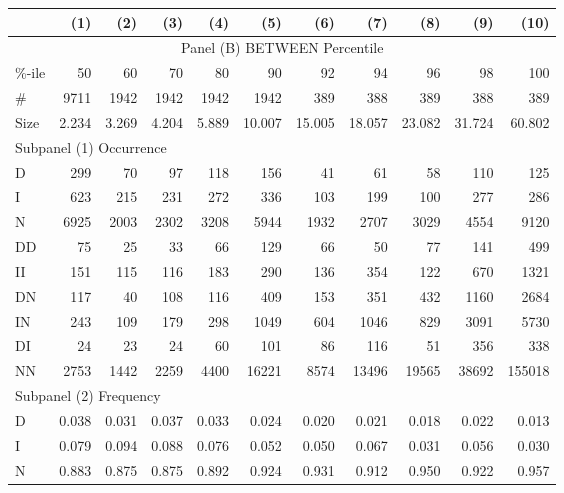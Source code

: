 \clearpage
{\footnotesize \begin{tabular}{lrrrrrrrrrr}
\hline\hline
&   (1) &   (2) &   (3) &   (4) &    (5) &    (6) &    (7) &    (8) &    (9) &   (10) \\ \hline\hline
\multicolumn{11}{c}{Panel (B) BETWEEN Percentile}                       \\ \hline\hline
\%-ile &    50 &    60 &    70 &    80 &     90 &     92 &     94 &     96 &     98 &    100 \\
\#     &  9711 &  1942 &  1942 &  1942 &   1942 &    389 &    388 &    389 &    388 &    389 \\
Size   & 2.234 & 3.269 & 4.204 & 5.889 & 10.007 & 15.005 & 18.057 & 23.082 & 31.724 & 60.802 \\ \hline
\multicolumn{11}{l}{Subpanel (1) Occurrence}                                                 \\ \hline
D      &   299 &    70 &    97 &   118 &    156 &     41 &     61 &     58 &    110 &    125 \\
I      &   623 &   215 &   231 &   272 &    336 &    103 &    199 &    100 &    277 &    286 \\
N      &  6925 &  2003 &  2302 &  3208 &   5944 &   1932 &   2707 &   3029 &   4554 &   9120 \\
DD     &    75 &    25 &    33 &    66 &    129 &     66 &     50 &     77 &    141 &    499 \\
II     &   151 &   115 &   116 &   183 &    290 &    136 &    354 &    122 &    670 &   1321 \\
DN     &   117 &    40 &   108 &   116 &    409 &    153 &    351 &    432 &   1160 &   2684 \\
IN     &   243 &   109 &   179 &   298 &   1049 &    604 &   1046 &    829 &   3091 &   5730 \\
DI     &    24 &    23 &    24 &    60 &    101 &     86 &    116 &     51 &    356 &    338 \\
NN     &  2753 &  1442 &  2259 &  4400 &  16221 &   8574 &  13496 &  19565 &  38692 & 155018 \\ \hline
\multicolumn{11}{l}{Subpanel (2) Frequency}                                                  \\ \hline
D      & 0.038 & 0.031 & 0.037 & 0.033 &  0.024 &  0.020 &  0.021 &  0.018 &  0.022 &  0.013 \\
I      & 0.079 & 0.094 & 0.088 & 0.076 &  0.052 &  0.050 &  0.067 &  0.031 &  0.056 &  0.030 \\
N      & 0.883 & 0.875 & 0.875 & 0.892 &  0.924 &  0.931 &  0.912 &  0.950 &  0.922 &  0.957 \\

\end{tabular}}
